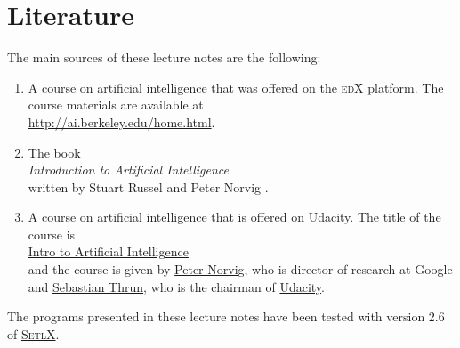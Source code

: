 \section{Literature}
The main sources of these lecture notes are the following:
\begin{enumerate}
\item A course on artificial intelligence that was offered on the \textsc{edX} platform.  The course
      materials are available at  
      \\[0.2cm]
      \hspace*{1.3cm}
      \href{http://ai.berkeley.edu/home.html}{http://ai.berkeley.edu/home.html}.
\item The book
      \\[0.2cm]
      \hspace*{1.3cm}
      \emph{Introduction to Artificial Intelligence}
      \\[0.2cm]
      written by Stuart Russel and Peter Norvig \cite{russell:2009}.
\item A course on artificial intelligence that is offered on \href{https://www.udacity.com}{Udacity}.  The title of the
      course is
      \\[0.2cm]
      \hspace*{1.3cm}
      \href{https://www.udacity.com/course/intro-to-artificial-intelligence--cs271}{Intro to Artificial Intelligence}
      \\[0.2cm]
      and the course is given by \href{https://en.wikipedia.org/wiki/Peter_Norvig}{Peter Norvig}, who is
      director of research at Google and \href{https://en.wikipedia.org/wiki/Sebastian_Thrun}{Sebastian Thrun},
      who is the chairman of \href{https://www.udacity.com}{Udacity}.
\end{enumerate}
The programs presented in these lecture notes have been tested with version 2.6 of 
\href{https://randoom.org/Software/SetlX}{\textsc{SetlX}}.


